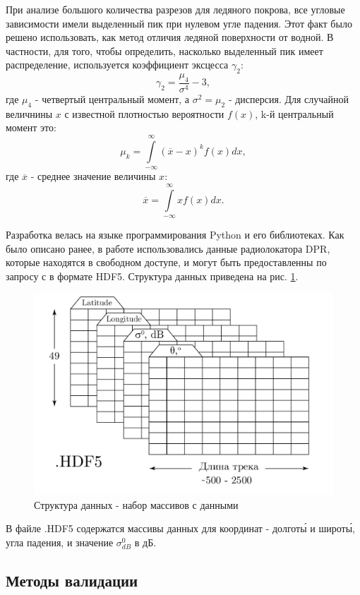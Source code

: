 При анализе большого количества разрезов для ледяного покрова, все  угловые зависимости имели выделенный пик при нулевом
угле падения. Этот факт было решено использовать, как метод отличия ледяной поверхности от водной. В частности, для
того, чтобы определить, насколько выделенный пик имеет распределение, используется коэффициент эксцесса $\gamma_2$:
\begin{equation}
  \gamma_2 = \frac{\mu_4}{\sigma^4} -3,
  \label{eq:5}
\end{equation}
где $\mu_4$ - четвертый центральный момент, а $\sigma^2 = \mu_2$ - дисперсия. Для случайной величнины $x$ с известной плотностью вероятности $f(x)$, k-й
центральный момент это:
\begin{equation}
  \mu_k = \int \limits_{-\infty}^{\infty}(\overline{x}-x)^k f(x) dx,
  \label{eq:6}
\end{equation} 
где $\overline{x}$ - среднее значение величины $x$:
\begin{equation}
  \overline{x} = \int \limits_{-\infty}^{\infty}x f(x) dx.
  \label{eq:7}
\end{equation}

 

Разработка велась на языке программирования Python и его библиотеках. Как было описано ранее, в работе использовались
данные радиолокатора DPR, которые находятся в свободном доступе, и могут
быть предоставленны по запросу с \cite{data} в формате HDF5. Структура данных приведена на рис. \ref{fig:5}.

\begin{figure}[h!]
  \centering
  \includegraphics[width = 0.55\linewidth]{img/struct.pdf}
  \caption{Структура данных - набор массивов с данными}
  \label{fig:5}
\end{figure}

В файле .HDF5 содержатся массивы данных для координат - долгот\'{ы} и широт\'{ы}, угла падения, и значение $\sigma^0_{dB}$ в
дБ. 

\subsection{Методы валидации}

